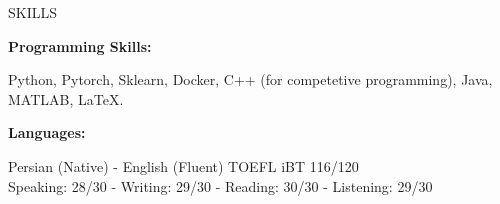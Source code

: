 \documentclass{resume} %
\begin{document}

\begin{rSection}{SKILLS}
\begin{minipage}[t]{3.2in}
\begin{center}
{\bf Programming Skills:} 

\begin{footnotesize} Python, Pytorch, Sklearn, Docker, C++ (for competetive programming), Java, MATLAB, \LaTeX. \end{footnotesize}
\end{center}
\end{minipage}
\hspace{0cm}
\begin{minipage}[t]{4in}
\begin{center}
{\bf Languages:}\\
\vspace{0.2cm}
\begin{footnotesize} Persian (Native) - English (Fluent) TOEFL iBT 116/120\\ Speaking: 28/30 - Writing: 29/30 - Reading: 30/30 - Listening: 29/30 
\end{footnotesize}
\end{center}
\end{minipage}
\end{rSection}


\end{document}
